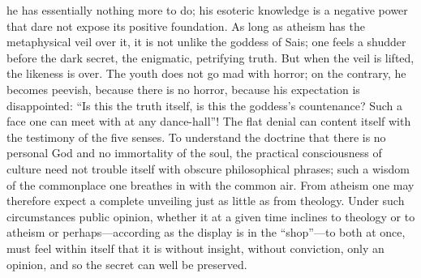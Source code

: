 \documentclass[12pt,a4paper,openany]{book}
\newcommand{\opage}[1]{\marginnote{\footnotesize\textit{[#1]}}}
\begin{document}
he has essentially nothing more to do; his esoteric
knowledge is a negative power that dare not expose its positive
foundation. As long as atheism has the metaphysical
veil over it, it is not unlike the goddess of Sais;
one feels a shudder before the dark secret, the
enigmatic, petrifying truth. But when the veil is lifted,
the likeness is over. The youth does not
go mad with horror; on the contrary, he becomes peevish,
because there is no horror, because his expectation
is disappointed: ``Is this the truth itself, is this the goddess's
countenance? Such a face one can meet with at any
dance-hall''! The flat denial can content itself
with the testimony of the five senses. To understand
the doctrine that there is no personal God and no
immortality of the soul, the practical consciousness of culture
need not trouble itself with obscure philosophical phrases;
such a wisdom of the commonplace one
breathes in with the common air. From atheism one may
\setcounter{footnote}{0}%
\opage{525}therefore expect a complete unveiling just as little as from
theology. Under such circumstances public
opinion, whether it at a given time
inclines to theology or to atheism or perhaps---according as the display is in the ``shop''---to both
at once, must feel within itself that it is without insight,
without conviction, only an opinion, and so the secret
can well be preserved.
\end{document}
